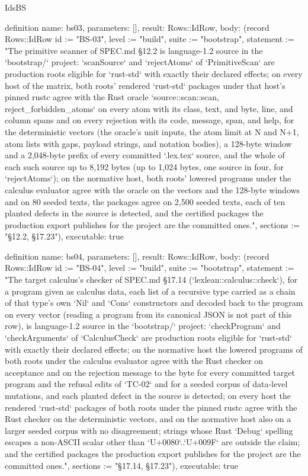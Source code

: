 \begin{lexlean}{IdsBS}
\begin{semanticmodule}
definition{
  name: bs03,
  parameters: [],
  result: Rows::IdRow,
  body: (record Rows::IdRow {id := "BS-03", level := "build", suite := "bootstrap", statement := "The primitive scanner of SPEC.md §12.2 is language-1.2 source in the `bootstrap/` project: `scanSource` and `rejectAtoms` of `PrimitiveScan` are production roots eligible for `rust-std` with exactly their declared effects; on every host of the matrix, both roots' rendered `rust-std` packages under that host's pinned rustc agree with the Rust oracle `source::scan::{scan, reject_forbidden_atoms}` on every atom with its class, text, and byte, line, and column spans and on every rejection with its code, message, span, and help, for the deterministic vectors (the oracle's unit inputs, the atom limit at N and N+1, atom lists with gaps, payload strings, and notation bodies), a 128-byte window and a 2,048-byte prefix of every committed `.lex.tex` source, and the whole of each such source up to 8,192 bytes (up to 1,024 bytes, one source in four, for `rejectAtoms`); on the normative host, both roots' lowered programs under the calculus evaluator agree with the oracle on the vectors and the 128-byte windows and on 80 seeded texts, the packages agree on 2,500 seeded texts, each of ten planted defects in the source is detected, and the certified packages the production export publishes for the project are the committed ones.", sections := "§12.2, §17.23"}),
  executable: true
}

definition{
  name: bs04,
  parameters: [],
  result: Rows::IdRow,
  body: (record Rows::IdRow {id := "BS-04", level := "build", suite := "bootstrap", statement := "The target calculus's checker of SPEC.md §17.14 (`lexlean::calculus::check`), for a program given as calculus data, each list of a recursive type carried as a chain of that type's own `Nil` and `Cons` constructors and decoded back to the program on every vector (reading a program from its canonical JSON is not part of this row), is language-1.2 source in the `bootstrap/` project: `checkProgram` and `checkArguments` of `CalculusCheck` are production roots eligible for `rust-std` with exactly their declared effects; on the normative host the lowered programs of both roots under the calculus evaluator agree with the Rust checker on acceptance and on the rejection message to the byte for every committed target program and the refusal edits of `TC-02` and for a seeded corpus of data-level mutations, and each planted defect in the source is detected; on every host the rendered `rust-std` packages of both roots under the pinned rustc agree with the Rust checker on the deterministic vectors, and on the normative host also on a larger seeded corpus with no disagreement; strings whose Rust `Debug` spelling escapes a non-ASCII scalar other than `U+0080`..`U+009F` are outside the claim; and the certified packages the production export publishes for the project are the committed ones.", sections := "§17.14, §17.23"}),
  executable: true
}


\end{semanticmodule}
\end{lexlean}
